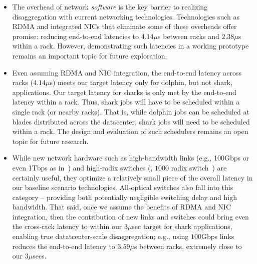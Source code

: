 \begin{itemize}[leftmargin=*]
\itemsep0em
	\item The overhead of network \emph{software} is the key barrier to realizing disaggregation with current networking technologies. Technologies such as RDMA and integrated NICs that eliminate some of these overheads offer promise: reducing end-to-end latencies to $4.14\mu$s between racks and $2.38\mu$s within a rack. However, demonstrating such latencies in a working prototype remains an important topic for future exploration.
	\item Even assuming RDMA and NIC integration, the end-to-end latency across racks ($4.14\mu$s) meets our target latency only for dolphin, but not shark, applications. Our target latency for sharks is only met by the end-to-end latency within a rack. Thus, shark jobs will have to be scheduled within a single rack (or nearby racks).
	That is, while dolphin jobs can be scheduled at blades distributed across the datacenter, shark jobs will need to be scheduled within a rack. The design and evaluation of such schedulers remains an open topic for future research.
	\item While new network hardware such as high-bandwidth links (e.g., 100Gbps or even 1Tbps as in~\cite{vladimir, firebox}) and high-radix switches (\eg, $1000$ radix switch~\cite{firebox})  are certainly useful, they optimize a relatively small piece of the overall latency in our baseline scenario technologies. All-optical switches also fall into this category -- providing both potentially negligible switching delay and high bandwidth. That said, once we assume the benefits of RDMA and NIC integration, then the contribution of new links and switches could bring even the cross-rack latency to within our 3$\mu$sec target for shark applications, enabling true datatcenter-scale disaggregation; e.g., using $100$Gbps links reduces the end-to-end latency to $3.59\mu$s between racks, extremely close to our 3$\mu$secs. 

\end{itemize}
